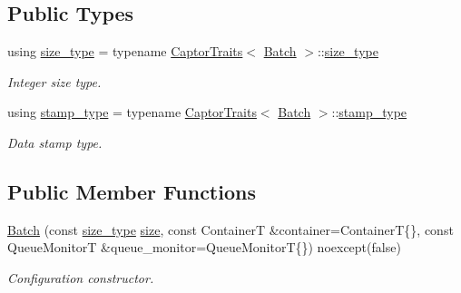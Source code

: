 \subsection*{Public Types}
\begin{DoxyCompactItemize}
\item 
\mbox{\label{classflow_1_1driver_1_1_batch_a81f688882ffe1a15ab3d8af872ffe6f7}} 
using \hyperlink{classflow_1_1driver_1_1_batch_a81f688882ffe1a15ab3d8af872ffe6f7}{size\+\_\+type} = typename \hyperlink{structflow_1_1_captor_traits}{Captor\+Traits}$<$ \hyperlink{classflow_1_1driver_1_1_batch}{Batch} $>$\+::\hyperlink{classflow_1_1driver_1_1_batch_a81f688882ffe1a15ab3d8af872ffe6f7}{size\+\_\+type}
\begin{DoxyCompactList}\small\item\em Integer size type. \end{DoxyCompactList}\item 
\mbox{\label{classflow_1_1driver_1_1_batch_af28211948e71149b26cff0e2345b830f}} 
using \hyperlink{classflow_1_1driver_1_1_batch_af28211948e71149b26cff0e2345b830f}{stamp\+\_\+type} = typename \hyperlink{structflow_1_1_captor_traits}{Captor\+Traits}$<$ \hyperlink{classflow_1_1driver_1_1_batch}{Batch} $>$\+::\hyperlink{classflow_1_1driver_1_1_batch_af28211948e71149b26cff0e2345b830f}{stamp\+\_\+type}
\begin{DoxyCompactList}\small\item\em Data stamp type. \end{DoxyCompactList}\end{DoxyCompactItemize}
\subsection*{Public Member Functions}
\begin{DoxyCompactItemize}
\item 
\hyperlink{classflow_1_1driver_1_1_batch_a021d7a60b375a2fea3716deb6e709487}{Batch} (const \hyperlink{classflow_1_1driver_1_1_batch_a81f688882ffe1a15ab3d8af872ffe6f7}{size\+\_\+type} \hyperlink{classflow_1_1_captor_interface_a1a4b3f7f6c1bd16a2cb672d90a1cbbc0}{size}, const ContainerT \&container=ContainerT\{\}, const Queue\+MonitorT \&queue\+\_\+monitor=Queue\+MonitorT\{\}) noexcept(false)
\begin{DoxyCompactList}\small\item\em Configuration constructor. \end{DoxyCompactList}\end{DoxyCompactItemize}
